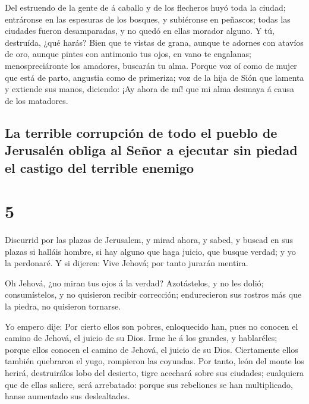  Del estruendo de la gente de á caballo y de los flecheros
huyó toda la ciudad; entráronse en las espesuras de los bosques, y
subiéronse en peñascos; todas las ciudades fueron desamparadas, y no
quedó en ellas morador alguno.  Y tú, destruída, ¿qué
harás? Bien que te vistas de grana, aunque te adornes con atavíos de
oro, aunque pintes con antimonio tus ojos, en vano te engalanas;
menospreciáronte los amadores, buscarán tu alma.  Porque
voz oí como de mujer que está de parto, angustia como de primeriza; voz
de la hija de Sión que lamenta y extiende sus manos, diciendo: ¡Ay ahora
de mí! que mi alma desmaya á causa de los matadores.

\hypertarget{la-terrible-corrupciuxf3n-de-todo-el-pueblo-de-jerusaluxe9n-obliga-al-seuxf1or-a-ejecutar-sin-piedad-el-castigo-del-terrible-enemigo}{%
\subsection{La terrible corrupción de todo el pueblo de Jerusalén obliga
al Señor a ejecutar sin piedad el castigo del terrible
enemigo}\label{la-terrible-corrupciuxf3n-de-todo-el-pueblo-de-jerusaluxe9n-obliga-al-seuxf1or-a-ejecutar-sin-piedad-el-castigo-del-terrible-enemigo}}

\hypertarget{section-4}{%
\section{5}\label{section-4}}

 Discurrid por las plazas de Jerusalem, y mirad ahora, y
sabed, y buscad en sus plazas si halláis hombre, si hay alguno que haga
juicio, que busque verdad; y yo la perdonaré.  Y si dijeren:
Vive Jehová; por tanto jurarán mentira.

 Oh Jehová, ¿no miran tus ojos á la verdad? Azotástelos, y
no les dolió; consumístelos, y no quisieron recibir corrección;
endurecieron sus rostros más que la piedra, no quisieron tornarse.

 Yo empero dije: Por cierto ellos son pobres, enloquecido
han, pues no conocen el camino de Jehová, el juicio de su Dios.
 Irme he á los grandes, y hablaréles; porque ellos conocen
el camino de Jehová, el juicio de su Dios. Ciertamente ellos también
quebraron el yugo, rompieron las coyundas.  Por tanto, león
del monte los herirá, destruirálos lobo del desierto, tigre acechará
sobre sus ciudades; cualquiera que de ellas saliere, será arrebatado:
porque sus rebeliones se han multiplicado, hanse aumentado sus
deslealtades.

